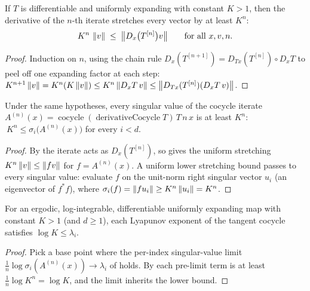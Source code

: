 \begin{lemma}\label{cocycle_expanding_bound}
  \leanok
  If \(T\) is differentiable and uniformly expanding with constant \(K > 1\), then the derivative
  of the \(n\)-th iterate stretches every vector by at least \(K^n\):
  \[
    K^n\,\left\lVert v \right\rVert \;\le\; \bigl\lVert D_x\bigl(T^{[n]}\bigr)v \bigr\rVert
    \qquad\text{for all } x, v, n .
  \]
\end{lemma}
\begin{proof}\leanok
  Induction on \(n\), using the chain rule \(D_x(T^{[n+1]}) = D_{Tx}(T^{[n]})\circ D_xT\) to peel
  off one expanding factor at each step:
  \(K^{n+1}\left\lVert v \right\rVert = K^n(K\left\lVert v \right\rVert) \le K^n\left\lVert D_xT\,v \right\rVert \le
  \left\lVert D_{Tx}(T^{[n]})(D_xT\,v) \right\rVert\).
\end{proof}

\begin{lemma}\label{expanding_pow_le_singularValues}
  \leanok
  Under the same hypotheses, every singular value of the cocycle iterate
  \(A^{(n)}(x) = \operatorname{cocycle}(\operatorname{derivativeCocycle} T)\,T\,n\,x\) is at least
  \(K^n\): \(\ K^n\le\sigma_i\bigl(A^{(n)}(x)\bigr)\) for every \(i < d\).
\end{lemma}
\begin{proof}\leanok
  By  the iterate acts as \(D_x(T^{[n]})\), so
   gives the uniform stretching \(K^n\left\lVert v \right\rVert\le\left\lVert f v \right\rVert\) for
  \(f = A^{(n)}(x)\). A uniform lower stretching bound passes to every singular value: evaluate
  \(f\) on the unit-norm right singular vector \(u_i\) (an eigenvector of \(f^{*}f\)), where
  \(\sigma_i(f) = \left\lVert f u_i \right\rVert\ge K^n\left\lVert u_i \right\rVert = K^n\).
\end{proof}

\begin{theorem}\label{log_le_exponents_of_expanding}
  \leanok
  For an ergodic, log-integrable, differentiable uniformly expanding map with constant \(K > 1\)
  (and \(d\ge 1\)), each Lyapunov exponent of the tangent cocycle satisfies
  \(\log K \le \lambda_i\).
\end{theorem}
\begin{proof}\leanok
  Pick a base point where the per-index singular-value limit
  \(\frac1n\log\sigma_i(A^{(n)}(x))\to\lambda_i\) of 
  holds. By  each pre-limit term is at least
  \(\frac1n\log K^n = \log K\), and the limit inherits the lower bound.
\end{proof}

